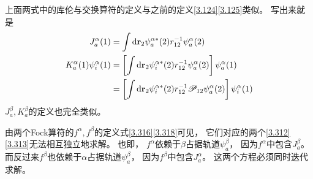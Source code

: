 上面两式中的库伦与交换算符的定义与之前的定义\eqref{3.124}\eqref{3.125}类似。
写出来就是
\begin{align}
	J_a^\alpha(1) & = \int \dd\bfr_2 \psi_a^{\alpha*}(2) \twoe \psi_a^\alpha(2)\\
	K_a^\alpha(1)\psi_i^\alpha(1) &= \left[ \int \dd\bfr_2 \psi_i^{\alpha*}(2) \twoe \psi_a^\alpha(2)\right] \psi_a^\alpha(1) \\
	& = \left[ \int \dd\bfr_2 \psi_i^{\alpha*}(2) \twoe \mathscr{P}_{12}\psi_a^\alpha(2)\right] \psi_i^\alpha(1) \notag
\end{align}
$J_a^\beta,K_a^\beta$的定义也完全类似。

由两个Fock算符的$f^\alpha,f^\beta$的定义式\eqref{3.316}\eqref{3.318}可见，
它们对应的两个\eqref{3.312}\eqref{3.313}无法相互独立地求解。
也即，
$f^\alpha$依赖于$\beta$占据轨道$\psi_a^\beta$，
因为$f^\alpha$中包含$J_a^\beta$。
而反过来$f^\beta$也依赖于$\alpha$占据轨道$\psi_a^\beta$，
因为$f^\beta$中包含$J_a^\alpha$。
这两个方程必须同时迭代求解。


